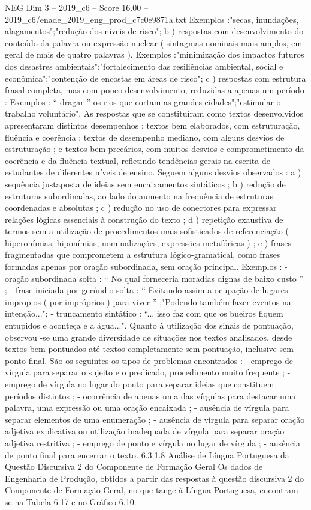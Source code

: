\begin{textsample}{NEG Dim 3 – 2019\_c6 – Score 16.00 – 2019\_c6/enade\_2019\_eng\_prod\_c7c0e9871a.txt}
Exemplos :"secas, inundações, alagamentos";"redução dos níveis de risco"; b ) respostas com desenvolvimento do conteúdo da palavra ou expressão nuclear ( sintagmas nominais mais amplos, em geral de mais de quatro palavras ).
Exemplos :"minimização dos impactos futuros dos desastres ambientais";"fortalecimento das resiliências ambiental, social e econômica";"contenção de encostas em áreas de risco"; c ) respostas com estrutura frasal completa, mas com pouco desenvolvimento, reduzidas a apenas um período : Exemplos : “ dragar ” os rios que cortam as grandes cidades";"estimular o trabalho voluntário".
As respostas que se constituíram como textos desenvolvidos apresentaram distintos desempenhos : textos bem elaborados, com estruturação, fluência e coerência ; textos de desempenho mediano, com alguns desvios de estruturação ; e textos bem precários, com muitos desvios e comprometimento da coerência e da fluência textual, refletindo tendências gerais na escrita de estudantes de diferentes níveis de ensino.
Seguem alguns desvios observados : a ) sequência justaposta de ideias sem encaixamentos sintáticos ; b ) redução de estruturas subordinadas, ao lado do aumento na frequência de estruturas coordenadas e absolutas ; c ) redução no uso de conectores para expressar relações lógicas essenciais à construção do texto ; d ) repetição exaustiva de termos sem a utilização de procedimentos mais sofisticados de referenciação ( hiperonímias, hiponímias, nominalizações, expressões metafóricas ) ; e ) frases fragmentadas que comprometem a estrutura lógico-gramatical, como frases formadas apenas por oração subordinada, sem oração principal.
Exemplos : - oração subordinada solta : “ No qual forneceria moradias dignas de baixo custo ” ; - frase iniciada por gerúndio solta : “ Evitando assim a ocupação de lugares impropios ( por impróprios ) para viver ” ;"Podendo também fazer eventos na intenção..."; - truncamento sintático : “... isso faz com que os bueiros fiquem entupidos e aconteça e a água...".
Quanto à utilização dos sinais de pontuação, observou -se uma grande diversidade de situações nos textos analisados, desde textos bem pontuados até textos completamente sem pontuação, inclusive sem ponto final.
São os seguintes os tipos de problemas encontrados : - emprego de vírgula para separar o sujeito e o predicado, procedimento muito frequente ; - emprego de vírgula no lugar do ponto para separar ideias que constituem períodos distintos ; - ocorrência de apenas uma das vírgulas para destacar uma palavra, uma expressão ou uma oração encaixada ; - ausência de vírgula para separar elementos de uma enumeração ; - ausência de vírgula para separar oração adjetiva explicativa ou utilização inadequada de vírgula para separar oração adjetiva restritiva ; - emprego de ponto e vírgula no lugar de vírgula ; - ausência de ponto final para encerrar o texto. 6.3.1.8 Análise de Língua Portuguesa da Questão Discursiva 2 do Componente de Formação Geral Os dados de Engenharia de Produção, obtidos a partir das respostas à questão discursiva 2 do Componente de Formação Geral, no que tange à Língua Portuguesa, encontram -se na Tabela 6.17 e no Gráfico 6.10.

\end{textsample}
